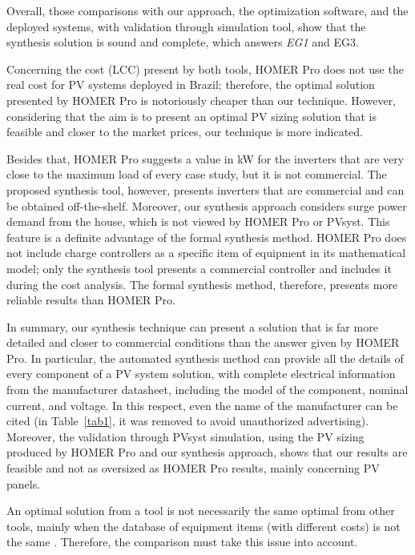 \documentclass[10pt,journal,compsoc]{IEEEtran}
\begin{document}
Overall, those comparisons with our approach, the optimization software, and the deployed systems, with validation through simulation tool, show that the synthesis solution is sound and complete, which answers \textit{EG1} and {EG3}.

Concerning the cost (LCC) present by both tools, HOMER Pro does not use the real cost for PV systems deployed in Brazil; therefore, the optimal solution presented by HOMER Pro is notoriously cheaper than our technique. However, considering that the aim is to present an optimal PV sizing solution that is feasible and closer to the market prices, our technique is more indicated.

Besides that, HOMER Pro suggests a value in kW for the inverters that are very close to the maximum load of every case study, but it is not commercial. The proposed synthesis tool, however, presents inverters that are commercial and can be obtained off-the-shelf. Moreover, our synthesis approach considers surge power demand from the house, which is not viewed by HOMER Pro or PVsyst. This feature is a definite advantage of the formal synthesis method. HOMER Pro does not include charge controllers as a specific item of equipment in its mathematical model; only the synthesis tool presents a commercial controller and includes it during the cost analysis. The formal synthesis method, therefore, presents more reliable results than HOMER Pro.

In summary, our synthesis technique can present a solution that is far more detailed and closer to commercial conditions than the answer given by HOMER Pro. In particular, the automated synthesis method can provide all the details of every component of a PV system solution, with complete electrical information from the manufacturer datasheet, including the model of the component, nominal current, and voltage. In this respect, even the name of the manufacturer can be cited (in Table~\ref{tab1}, it was removed to avoid unauthorized advertising). Moreover, the validation through PVsyst simulation, using the PV sizing produced by HOMER Pro and our synthesis approach, shows that our results are feasible and not as oversized as HOMER Pro results, mainly concerning PV panels.

An optimal solution from a tool is not necessarily the same optimal from other tools, mainly when the database of equipment items (with different costs) is not the same \cite{Alsadi2018}. Therefore, the comparison must take this issue into account. 

\end{document}
